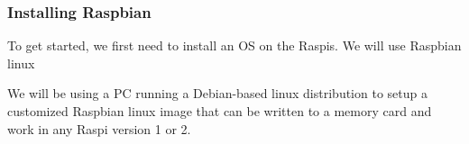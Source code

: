 



\subsubsection{Installing Raspbian}

To get started, we first need to install an \ac{OS} on the
\ac{Raspi}s. We will use Raspbian linux~\cite{raspbian}

We will be using a \ac{PC} running a Debian-based linux distribution
to setup a customized Raspbian linux image that can be written to
a memory card and work in any \ac{Raspi} version 1 or 2.





%



